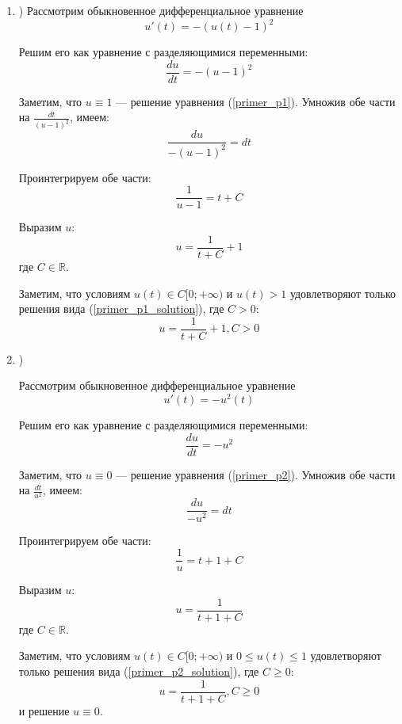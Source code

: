 \begin{enumerate}

\item)
Рассмотрим обыкновенное дифференциальное уравнение
\begin{equation}\label{primer_p1}
	u'(t)=-(u(t)-1)^2
\end{equation}

Решим его как уравнение с разделяющимися переменными:
$$
	\frac{du}{dt}=-(u-1)^2
$$

Заметим, что $u\equiv 1$ --- решение уравнения (\ref{primer_p1}).
Умножив обе части на $\frac{dt}{(u-1)^2}$, имеем:
$$
	\frac{du}{-(u-1)^2}=dt
$$

Проинтегрируем обе части:
$$
	\frac{1}{u-1}=t+C
$$

Выразим $u$:
\begin{equation}\label{primer_p1_solution}
	u=\frac{1}{t+C}+1
\end{equation}
где $C\in\mathbb{R}$.

Заметим, что условиям $u(t) \in C[0; +\infty)$ и $u(t)>1$ удовлетворяют только решения вида (\ref{primer_p1_solution}), где $C>0$:
\begin{equation}
	u=\frac{1}{t+C}+1, C>0
\end{equation}


\item)

Рассмотрим обыкновенное дифференциальное уравнение
\begin{equation}\label{primer_p2}
	u'(t)=-u^2(t)
\end{equation}

Решим его как уравнение с разделяющимися переменными:
$$
	\frac{du}{dt}=-u^2
$$

Заметим, что $u\equiv 0$ --- решение уравнения (\ref{primer_p2}).
Умножив обе части на $\frac{dt}{u^2}$, имеем:
$$
	\frac{du}{-u^2}=dt
$$

Проинтегрируем обе части:
$$
	\frac{1}{u}=t+1+C
$$

Выразим $u$:
\begin{equation}\label{primer_p2_solution}
	u=\frac{1}{t+1+C}
\end{equation}
где $C\in\mathbb{R}$.

Заметим, что условиям $u(t) \in C[0; +\infty)$ и $0 \leq u(t) \leq 1$ удовлетворяют только решения вида (\ref{primer_p2_solution}), где $C\geq0$:
\begin{equation}
	u=\frac{1}{t+1+C}, C\geq0
\end{equation}
и решение $u \equiv 0$.





\end{enumerate}
